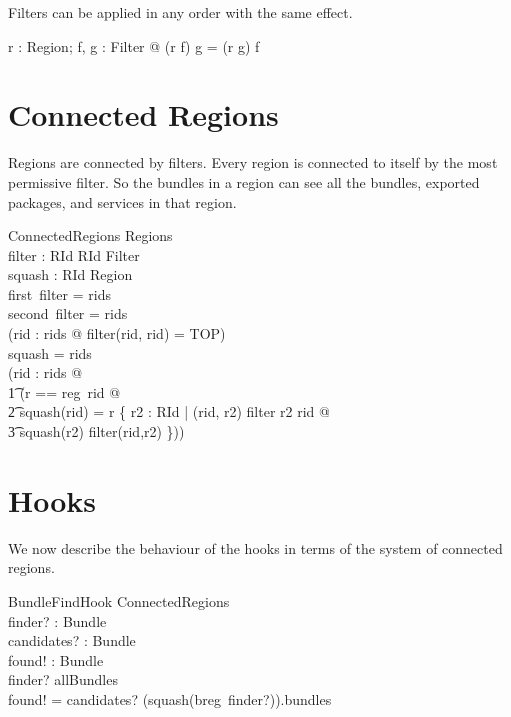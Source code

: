 \documentclass[a4paper,9pt]{article}
\begin{document}
Filters can be applied in any order with the same effect.
\begin{argue}
  \shows \forall r : Region; f, g : Filter @ (r \wr f) \wr g = (r \wr g) \wr f \\
\end{argue}

\clearpage
\section{Connected Regions}
\label{cha:connregions}

Regions are connected by filters.
Every region is connected to itself by the most permissive filter.
So the bundles in a region can see all the bundles, exported packages, and services in that region.
\begin{schema}{ConnectedRegions}
  Regions \\
  filter : RId \cross RId \pfun Filter \\
  squash : RId \pfun Region \\
\where
  first~\limg \dom filter \rimg = rids \\
  second~\limg \dom filter \rimg = rids \\
  (\forall rid : rids @ filter(rid, rid) = TOP) \\
  \dom squash = rids \\
  (\forall rid : rids @ \\
\t1 (\LET r == reg~rid @ \\
\t2 squash(rid) = r \sqcup \bigsqcup \{ r2 : RId | (rid, r2) \in \dom filter \land r2 \neq rid @ \\
\t3 squash(r2) \wr filter(rid,r2) \}))\\
\end{schema}

\clearpage
\section{Hooks}
\label{cha:hooks}

We now describe the behaviour of the hooks in terms of the system of connected regions.

\begin{schema}{BundleFindHook}
  \Xi ConnectedRegions \\
  finder? : Bundle \\
  candidates? : \power Bundle \\
  found! : \power Bundle \\
\where
  finder? \in allBundles \\
  found! = candidates? \cap (squash(breg~finder?)).bundles \\
\end{schema}
\end{document}
